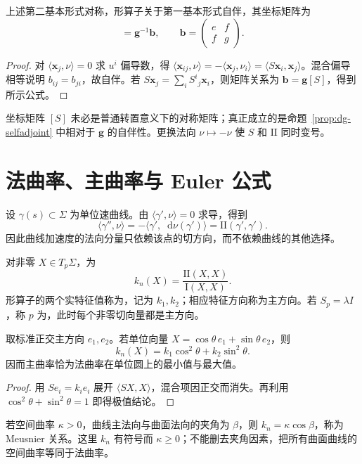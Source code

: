 \documentclass[UTF8,12pt,a4paper,fontset=fandol]{ctexbook}
\newcommand{\dd}{\mathop{}\!\mathrm d}
\newcommand{\ip}[2]{\langle #1,#2\rangle}
\begin{document}
\begin{proposition}[形算子的自伴性]
上述第二基本形式对称，形算子关于第一基本形式自伴，其坐标矩阵为
\begin{equation}
 [S]=\mathbf g^{-1}\mathbf b,\qquad
 \mathbf b=\begin{pmatrix}e&f\\f&g\end{pmatrix}.
 \label{eq:dg-shape-matrix}
\end{equation}
\end{proposition}
\begin{proof}
对 $\ip{\mathbf x_j}\nu=0$ 求 $u^i$ 偏导数，得 $\ip{\mathbf x_{ij}}\nu=-\ip{\mathbf x_j}{\nu_i}=\ip{S\mathbf x_i}{\mathbf x_j}$。混合偏导相等说明 $b_{ij}=b_{ji}$，故自伴。若 $S\mathbf x_j=\sum_iS^i{}_j\mathbf x_i$，则矩阵关系为 $\mathbf b=\mathbf g[S]$，得到所示公式。
\end{proof}
坐标矩阵 $[S]$ 未必是普通转置意义下的对称矩阵；真正成立的是命题~\ref{prop:dg-selfadjoint} 中相对于 $\mathbf g$ 的自伴性。更换法向 $\nu\mapsto-\nu$ 使 $S$ 和 $\mathrm{II}$ 同时变号。

\section{法曲率、主曲率与 Euler 公式}
设 $\gamma(s)\subset\Sigma$ 为单位速曲线。由 $\ip{\gamma'}\nu=0$ 求导，得到
\[
 \ip{\gamma''}\nu=-\ip{\gamma'}{\dd\nu(\gamma')}
 =\mathrm{II}(\gamma',\gamma').
\]
因此曲线加速度的法向分量只依赖该点的切方向，而不依赖曲线的其他选择。

\begin{definition}[法曲率与主曲率]
对非零 $X\in T_p\Sigma$，为
\[
 k_n(X)=\frac{\mathrm{II}(X,X)}{\mathrm I(X,X)}.
\]
形算子的两个实特征值称为，记为 $k_1,k_2$；相应特征方向称为主方向。若 $S_p=\lambda I$，称 $p$ 为，此时每个非零切向量都是主方向。
\end{definition}

\begin{theorem}
取标准正交主方向 $e_1,e_2$。若单位向量 $X=\cos\theta\,e_1+\sin\theta\,e_2$，则
\begin{equation}
 k_n(X)=k_1\cos^2\theta+k_2\sin^2\theta.
 \label{eq:dg-euler-curvature}
\end{equation}
因而主曲率恰为法曲率在单位圆上的最小值与最大值。
\end{theorem}
\begin{proof}
用 $Se_i=k_ie_i$ 展开 $\ip{SX}{X}$，混合项因正交而消失。再利用 $\cos^2\theta+\sin^2\theta=1$ 即得极值结论。
\end{proof}
若空间曲率 $\kappa>0$，曲线主法向与曲面法向的夹角为 $\beta$，则 $k_n=\kappa\cos\beta$，称为 Meusnier 关系。这里 $k_n$ 有符号而 $\kappa\ge0$；不能删去夹角因素，把所有曲面曲线的空间曲率等同于法曲率。
\end{document}
